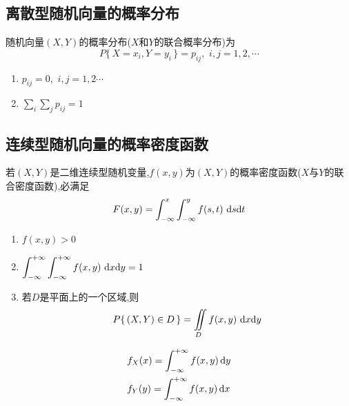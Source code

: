\subsection{离散型随机向量的概率分布}
\noindent {}\jg
\par 随机向量$(X,Y)$的概率分布($X$和$Y$的联合概率分布)为
\begin{equation}
P \lbrace\, X=x_i,Y=y_i \, \rbrace=p_{ij},\,\,i,j=1,2,\cdots
\end{equation}
\noindent \dya[离散型随机向量的概率分布的性质]
\begin{enumerate}[1.]
	\setlength{\itemindent}{2em}
	\setlength{\topsep}{0.01em}
	\setlength{\itemsep}{0.01em}
	\item $\displaystyle p_{ij} = 0,\,\,i,j=1,2\cdots$
	\item $\displaystyle \sum\limits_{i}\sum\limits_{j}p_{ij}=1$
\end{enumerate}

\subsection{连续型随机向量的概率密度函数}
\noindent {}\jg
\par 若$(X,Y)$是二维连续型随机变量,$f(x,y)$为$(X,Y)$的概率密度函数($X$与$Y$的联合密度函数),必满足
\begin{equation}
F(x,y)=\int_{-\infty }^{x}\int_{-\infty }^{y}f(s,t)\,\,{\rm{d}} s{\rm{d}} t
\end{equation}
\noindent \dya[离散型随机向量的概率分布的性质]
\begin{enumerate}[1.]
	\setlength{\itemindent}{2em}
	\setlength{\topsep}{0.01em}
	\setlength{\itemsep}{0.01em}
	\item $\displaystyle f(x,y)>0$\jg
	\item $\displaystyle \int_{-\infty }^{+\infty}\int_{-\infty }^{+\infty }f(x,y)\,\,{\rm{d}} x{\rm{d}} y=1$\jg
	\item 若$D$是平面上的一个区域,则
	$$
	P\lbrace \, (X,Y) \in D\, \rbrace=\iint\limits_{D}f(x,y)\,\,{\rm{d}} x{\rm{d}} y
	$$
\end{enumerate}

\noindent {}
\sj
\begin{equation}
\begin{split}
&f_X(x)=\int_{-\infty}^{+\infty}f(x,y)\,{\rm{d}} y\\
&f_Y(y)=\int_{-\infty}^{+\infty}f(x,y)\,{\rm{d}} x
\end{split}
\end{equation}

